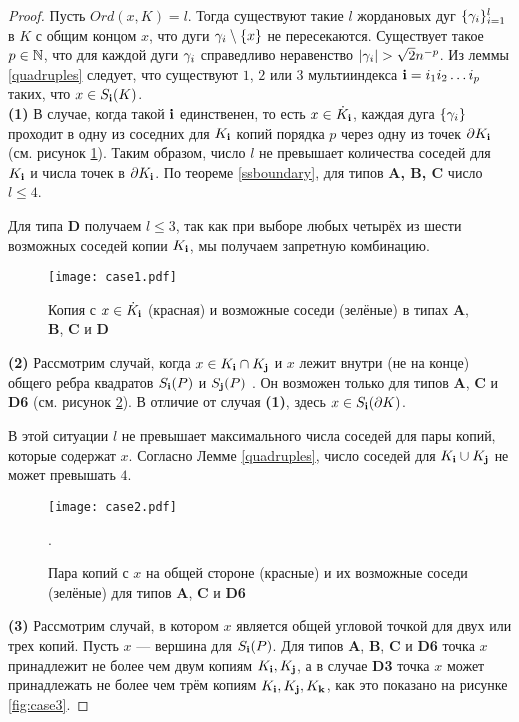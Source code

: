 \begin{proof}\label{proof:point_branching}
Пусть $Ord(x,K)=l$.
Тогда существуют такие $l$ жордановых дуг $\{\gamma_i\}_{i=1}^l$ в $K$ с общим концом $x$, что дуги $\gamma_i\setminus \{x\}$ не пересекаются.
Существует такое $p\in\mathbb{N}$, что для каждой дуги $\gamma_i$ справедливо неравенство $|\ga_i|>\sqrt{2}n^{-p}$.
Из леммы \ref{quadruples} следует, что существуют $1$, $2$ или $3$ мультииндекса ${\bf{i}}=i_1i_2\ldots i_p$ таких, что $x\in S_{\bf{i}}(K)$.\\

\textbf{(1)} В случае, когда такой ${\bf{i}}$ единственен, то есть $x\in \dot K_{\bf{i}}$, каждая дуга $\{\gamma_i\}$ проходит в одну из соседних для $K_{\bf{i}}$ копий порядка $p$ через одну из точек $\partial K_{\bf{i}}$ (см. рисунок \ref{fig:case1}). 
Таким образом, число $l$ не превышает количества соседей для $K_{\bf{i}}$  и числа точек в $\partial K_{\bf{i}}$. 
По теореме \ref{ssboundary}, для типов {\bf A, B, C} число $l\leq 4$.

Для типа {\bf D} получаем $l\le 3$, так как при выборе любых четырёх из шести возможных соседей копии $K_{\bf{i}}$, мы получаем запретную комбинацию.

\begin{figure}[H]
\centering
\texttt{[image: case1.pdf]}
\caption{Копия с $x\in\dot K_{\bf{i}}$ (красная) и возможные соседи (зелёные) в типах \textbf{A}, \textbf{B}, \textbf{C} и \textbf{D}}
\label{fig:case1}
\end{figure}

\textbf{(2)} Рассмотрим случай, когда $x\in K_{\bf{i}}\cap K_{\bf{j}}$ и $x$ лежит внутри (не на конце) общего ребра квадратов $S_{\bf{i}}(P)$ и $S_{\bf{j}}(P)$ .
Он возможен только для типов \textbf{A}, \textbf{C} и \textbf{D6} (см. рисунок \ref{fig:case2}).
В отличие от случая \textbf{(1)}, здесь $x\in S_{\bf{i}}(\partial K)$.

В этой ситуации $l$ не превышает максимального числа соседей для пары копий, которые содержат $x$.
Согласно Лемме \ref{quadruples}, число соседей для $K_{\bf{i}}\cup K_{\bf{j}}$ не может превышать $4$.

\begin{figure}[H]
\centering
\texttt{[image: case2.pdf]}
\caption{Пара копий с $x$ на общей стороне (красные) и их возможные соседи (зелёные) для типов \textbf{A}, \textbf{C} и \textbf{D6}}. 
\label{fig:case2}
\end{figure}

\textbf{(3)} Рассмотрим случай, в котором $x$ является общей угловой точкой для двух или трех копий.
Пусть $x$ --- вершина для $S_{\bf{i}}(P)$.
Для типов \textbf{A},  \textbf{B}, \textbf{C} и \textbf{D6} точка $x$ принадлежит не более чем двум копиям $K_{\bf{i}}, K_{\bf{j}}$, а в случае \textbf{D3} точка $x$ может принадлежать не более чем трём копиям $K_{\bf{i}}, K_{\bf{j}}, K_{\bf{k}}$, как это показано на рисунке \ref{fig:case3}.


\end{proof}
